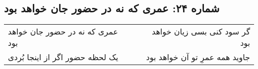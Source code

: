 \begin{center}
\section*{شماره ۲۴: عمری که نه در حضور جان خواهد بود}
\label{sec:024}
\begin{longtable}{l p{0.5cm} r}
عمری که نه در حضور جان خواهد بود
&&
گر سود کنی بسی زیان خواهد بود
\\
یک لحظه حضور اگر از اینجا بُردی
&&
جاوید همه عمرِ تو آن خواهد بود
\\
\end{longtable}
\end{center}

